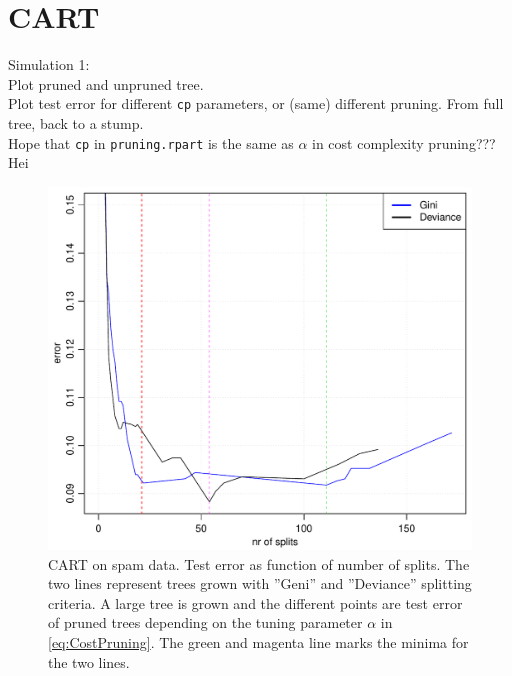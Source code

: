 \section{CART}
\label{sec:CARTsim}
Simulation 1: \\
Plot pruned and unpruned tree. \\
Plot test error for different \verb+cp+ parameters, or (same) different pruning. From full tree, back to a stump.\\
Hope that \verb+cp+ in \verb+pruning.rpart+ is the same as $\alpha$ in cost complexity pruning??? Hei

\begin{figure}[h!]
\begin{center}
    \includegraphics[scale=0.5]{./figures/cartCPSpam.pdf}
\end{center}
\caption{CART on spam data. Test error as function of number of splits. The two lines represent trees grown with ''Geni'' and ''Deviance'' splitting criteria. A large tree is grown and the different points are test error of pruned trees depending on the tuning parameter $\alpha$ in \eqref{eq:CostPruning}. The green and magenta line marks the minima for the two lines. }
\label{fig:cartCPSpam}
\end{figure}

